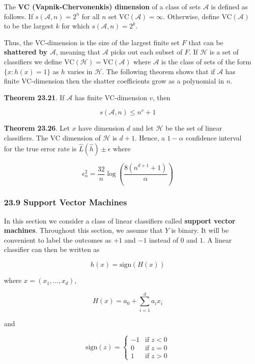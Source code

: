 The \textbf{VC (Vapnik-Chervonenkis) dimension} of a class of sets
\(\mathcal{A}\) is defined as follows. If \(s(\mathcal{A}, n) = 2^n\)
for all \(n\) set \(\text{VC}(\mathcal{A}) = \infty\). Otherwise, define
\(\text{VC}(\mathcal{A})\) to be the largest \(k\) for which
\(s(\mathcal{A}, n) = 2^k\).

Thus, the VC-dimension is the size of the largest finite set \(F\) that
can be \textbf{shattered by \(\mathcal{A}\)}, meaning that
\(\mathcal{A}\) picks out each subset of \(F\). If \(\mathcal{H}\) is a
set of classifiers we define
\(\text{VC}(\mathcal{H}) = \text{VC}(\mathcal{A})\) where
\(\mathcal{A}\) is the class of sets of the form \(\{ x : h(x) = 1 \}\)
as \(h\) varies in \(\mathcal{H}\). The following theorem shows that if
\(\mathcal{A}\) has finite VC-dimension then the shatter coefficients
grow as a polynomial in \(n\).

\textbf{Theorem 23.21}. If \(\mathcal{A}\) has finite VC-dimension
\(v\), then

\[ s(\mathcal{A}, n) \leq n^v + 1 \]

\textbf{Theorem 23.26}. Let \(x\) have dimension \(d\) and let
\(\mathcal{H}\) be the set of linear classifiers. The VC dimension of
\(\mathcal{H}\) is \(d + 1\). Hence, a \(1 - \alpha\) confidence
interval for the true error rate is \(\hat{L}(\hat{h}) \pm \epsilon\)
where

\[ \epsilon_n^2 = \frac{32}{n} \log \left( \frac{8 (n^{d + 1} + 1)}{\alpha} \right) \]

\subsubsection{23.9 Support Vector Machines}\label{support-vector-machines}

In this section we consider a class of linear classifiers called
\textbf{support vector machines}. Throughout this section, we assume
that \(Y\) is binary. It will be convenient to label the outcomes as
\(+1\) and \(-1\) instead of \(0\) and \(1\). A linear classifier can
then be written as

\[ h(x) = \text{sign}( H(x) ) \]

where \(x = (x_1, \dots, x_d)\),

\[ H(x) = a_0 + \sum_{i=1}^d a_i x_i \]

and

\[ \text{sign}(z) = \begin{cases}
-1 &\text{if } z < 0 \\
0  &\text{if } z = 0 \\
1  &\text{if } z > 0
\end{cases}\]


